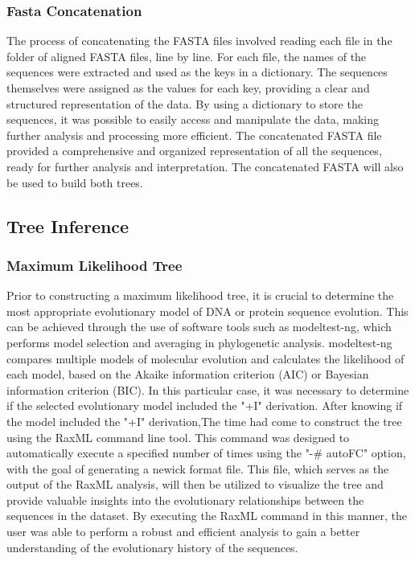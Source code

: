 \documentclass[12pt]{article}
\begin{document}
\subsubsection{Fasta Concatenation}
The process of concatenating the FASTA files involved reading each file in the folder of aligned FASTA files, line by line. For each file, the names of the sequences were extracted and used as the keys in a dictionary. The sequences themselves were assigned as the values for each key, providing a clear and structured representation of the data.\newline
By using a dictionary to store the sequences, it was possible to easily access and manipulate the data, making further analysis and processing more efficient. The concatenated FASTA file provided a comprehensive and organized representation of all the sequences, ready for further analysis and interpretation. The concatenated FASTA will also be used to build both trees.
\subsection{Tree Inference}
\subsubsection{Maximum Likelihood Tree}
Prior to constructing a maximum likelihood tree, it is crucial to determine the most appropriate evolutionary model of DNA or protein sequence evolution. This can be achieved through the use of software tools such as modeltest-ng, which performs model selection and averaging in phylogenetic analysis. modeltest-ng compares multiple models of molecular evolution and calculates the likelihood of each model, based on the Akaike information criterion (AIC) or Bayesian information criterion (BIC). In this particular case, it was necessary to determine if the selected evolutionary model included the "+I" derivation. After knowing if the model included the "+I" derivation,The time had come to construct the tree using the RaxML command line tool. This command was designed to automatically execute a specified number of times using the "-\# autoFC" option, with the goal of generating a newick format file. This file, which serves as the output of the RaxML analysis, will then be utilized to visualize the tree and provide valuable insights into the evolutionary relationships between the sequences in the dataset. By executing the RaxML command in this manner, the user was able to perform a robust and efficient analysis to gain a better understanding of the evolutionary history of the sequences.
\end{document}
